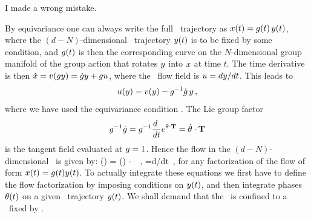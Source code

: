 






\begin{bartlett}
I made a wrong mistake.
\end{bartlett}

\noindent
By equivariance one can always write the full \statesp\
trajectory as $x(t)= g(t)\,y(t)$, where the
$(d\!-\!N)$-dimensional \reducedsp\ trajectory $y(t)$
is to be fixed by some condition, and $g(t)$ is then the
corresponding curve on the $N$-dimensional group manifold of
the group action that rotates $y$ into $x$ at time
$t$. The time derivative is then $\dot{x}=
v(gy) = \dot{g}y + gu$,
where the \reducedsp\ flow field is
$u={dy}/{dt}$. This leads to
\[
u(y) = v(y) - g^{-1} \dot{g} \, y
\,,
\]
where we have used the equivariance condition
. The Lie group factor
\[
g^{-1} \dot{g} =
g^{-1}\frac{d~}{dt} e^{{\bf \theta} \cdot \mathbf{T} } =
\dot{{\bf \theta}} \cdot \mathbf{T}
\]
is the tangent field evaluated at ${g} = 1$.
Hence the flow in the
$(d\!-\!N)$-dimensional \reducedsp\ is given by:
\beq
\velRed(\sspRed) = \vel(\sspRed) - \dot{\gSpace} \cdot \Lg \, \sspRed
\,,\qquad
\velRed={d\sspRed}/{dt}
\,,
for any factorization of the flow of form $x(t)=
g(t)y(t)$. To actually integrate these equations
we first have to define the flow factorization by imposing
conditions on $y(t)$, and then integrate phases
${\bf \theta}(t)$ on a given \reducedsp\ trajectory $y(t)$.
We shall demand that the \reducedsp\ is confined to a \slice\
fixed by .

